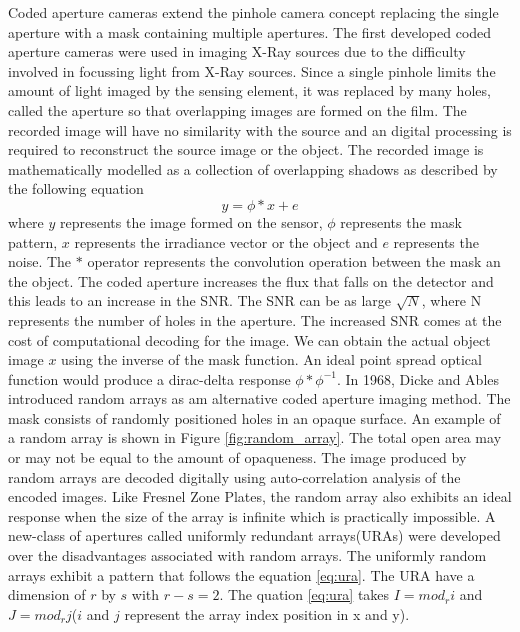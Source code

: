 Coded aperture cameras extend the pinhole camera concept replacing the single aperture with a mask containing multiple apertures. The first developed coded aperture cameras were used in imaging X-Ray sources due to the difficulty involved in focussing light from X-Ray sources\cite{Cannon1}. Since a single pinhole limits the amount of light imaged by the sensing element, it was replaced by many holes, called the aperture so that overlapping images are formed on the film. The recorded image will have no similarity with the source and an digital processing is required to reconstruct the source image or the object. The recorded image is mathematically modelled as a  collection of overlapping shadows as described by the following equation\cite{VBoomi}\cite{Cannon1} 
\begin{equation}
y = \phi * x + e
\label{eq:conv}
\end{equation}
where $y$ represents the image formed on the sensor, $\phi$ represents the mask pattern, $x$ represents the irradiance vector or the object and $e$ represents the noise. The $*$ operator represents the convolution operation between the mask an the object. The coded aperture increases the flux that falls on the detector and this leads to an increase in the SNR. The SNR can be as large $\sqrt{N}$, where N represents the number of holes in the aperture\cite{Cannon1}. The increased SNR comes at the cost of computational decoding for the image. We can obtain the actual object image $x$ using the inverse of the mask function. An ideal point spread optical function would produce a dirac-delta response $\phi * \phi^{-1}$.
In 1968, Dicke and Ables\cite{Cannon1} introduced random arrays as am alternative coded aperture imaging method. The mask consists of randomly positioned holes in an opaque surface. An example of a random array is shown in Figure \ref{fig:random_array}. The total open area may or may not be equal to the amount of opaqueness. The image produced by random arrays are decoded digitally using auto-correlation analysis of the encoded images\cite{Cannon1}. Like Fresnel Zone Plates, the random array also exhibits an ideal response when the size of the array is infinite which is practically impossible. A new-class of apertures called uniformly redundant arrays(URAs) were developed over the disadvantages associated with random arrays. The uniformly random arrays exhibit a pattern that follows the equation \ref{eq:ura}\cite{Fenimore:78}. The URA have a dimension of $r$ by $s$ with $r - s = 2$. The quation \ref{eq:ura} takes $I  = mod_ri$ and $J  = mod_rj$($i$ and $j$ represent the array index position in x and y).

